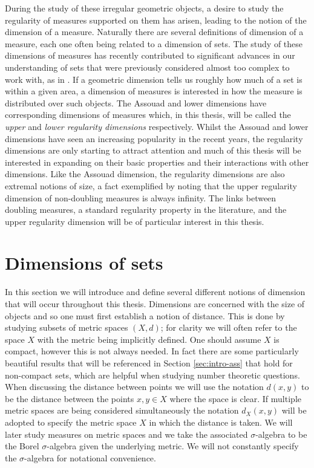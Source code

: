 During the study of these irregular geometric objects, a desire to study the regularity of measures supported on them has arisen, leading to the notion of the dimension of a measure. Naturally there are several definitions of dimension of a measure, each one often being related to a dimension of sets. The study of these dimensions of measures has recently contributed to significant advances in our understanding of sets that were previously considered almost too complex to work with, as in \cite{hochman}. If a geometric dimension tells us roughly how much of a set is within a given area, a dimension of measures is interested in how the measure is distributed over such objects. The Assouad and lower dimensions have corresponding dimensions of measures which, in this thesis, will be called the \textit{upper} and \textit{lower regularity dimensions} respectively. Whilst the Assouad and lower dimensions have seen an increasing popularity in the recent years, the regularity dimensions are only starting to attract attention and much of this thesis will be interested in expanding on their basic properties and their interactions with other dimensions. Like the Assouad dimension, the regularity dimensions are also extremal notions of size, a fact exemplified by noting that the upper regularity dimension of non-doubling measures is always infinity. The links between doubling measures, a standard regularity property in the literature, and the upper regularity dimension will be of particular interest in this thesis. 





\section{Dimensions of sets}
\label{sec:intro-sets}

In this section we will introduce and define several different notions of dimension that will occur throughout this thesis. Dimensions are concerned with the size of objects and so one must first establish a notion of distance. This is done by studying subsets of metric spaces $(X,d)$; for clarity we will often refer to the space $X$ with the metric being implicitly defined. One should assume $X$ is compact, however this is not always needed. In fact there are some particularly beautiful results that will be referenced in Section \ref{sec:intro-ass} that hold for non-compact sets, which are helpful when studying number theoretic questions. When discussing the distance between points we will use the notation $d(x,y)$ to be the distance between the points $x,y \in X$ where the space is clear. If multiple metric spaces are being considered simultaneously the notation $d_X(x,y)$ will be adopted to specify the metric space $X$ in which the distance is taken. We will later study measures on metric spaces and we take the associated $\sigma$-algebra to be the Borel $\sigma$-algebra given the underlying metric. We will not constantly specify the $\sigma$-algebra for notational convenience.

